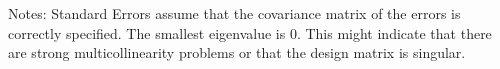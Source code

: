 \bigskip
Notes: \newline 
[1] Standard Errors assume that the covariance matrix of the errors is correctly specified. \newline 
[2] The smallest eigenvalue is      0. This might indicate that                there are strong multicollinearity problems or that the design                matrix is singular.